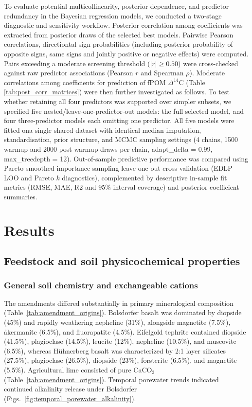 \documentclass[preprint,12pt]{elsarticle}
\begin{document}
To evaluate potential multicollinearity, posterior dependence, and predictor redundancy in the Bayesian regression models, we conducted a two-stage diagnostic and sensitivity workflow. Posterior correlation among coefficients was extracted from posterior draws of the selected best models. Pairwise Pearson correlations, directiontal sign probabilities (including posterior probability of opposite signs, same signs and jointly positive or negative effects) were computed. Pairs exceeding a moderate screening threshold ($\vert{}r\vert{} \ge 0.50$) were cross-checked against raw predictor associations (Pearson $r$ and Spearman $\rho$). Moderate correlations among coefficients for prediction of fPOM $\Delta^{14}$C (Table \ref{tab:post_corr_matrices}) were then further investigated as follows. To test whether retaining all four predictors was supported over simpler subsets, we specified five nested/leave-one-predictor-out models: the full selected model, and four three-predictor models each omitting one predictor. All five models were fitted ona single shared dataset with identical median imputation, standardisation, prior structure, and MCMC sampling settings (4 chains, 1500 warmup and 2000 post-warmup draws per chain, adapt\_delta = 0.99, max\_treedepth = 12). Out-of-sample predictive performance was compared using Pareto-smoothed importance sampling leave-one-out cross-validation (EDLP LOO and Pareto $k$ diagnostics), complemented by descriptive in-sample fit metrics (RMSE, MAE, R2 and 95\% interval coverage) and posterior coefficient summaries.

\section{Results}
\label{sec:results}

\subsection{Feedstock and soil physicochemical properties}
\label{subsec:geochemistry}

\subsubsection{General soil chemistry and exchangeable cations}
The amendments differed substantially in primary mineralogical composition (Table~\ref{tab:amendment_origins}). Bolsdorfer basalt was dominated by diopside (45\%) and rapidly weathering nepheline (31\%), alongside magnetite (7.5\%), \aa kermanite (6.5\%), and fluorapatite (4.5\%). Eifelgold tephrite contained diopside (41.5\%), plagioclase (14.5\%), leucite (12\%), nepheline (10.5\%), and muscovite (6.5\%), whereas H\"uhnerberg basalt was characterized by 2:1 layer silicates (27.5\%), plagioclase (26.5\%), diopside (23\%), forsterite (6.5\%), and magnetite (5.5\%). Agricultural lime consisted of pure CaCO$_3$ (Table~\ref{tab:amendment_origins}). Temporal porewater trends indicated continued alkalinity release under Bolsdorfer (Figs.~\ref{fig:temporal_porewater_alkalinity}). 
\end{document}
